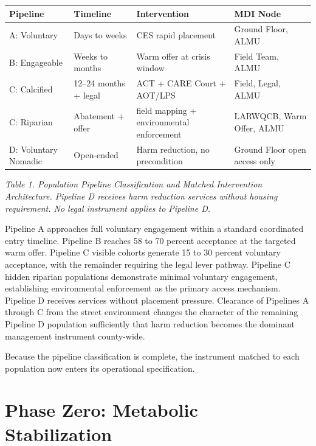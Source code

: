 \documentclass[12pt, letterpaper]{article}
\begin{document}
{\singlespacing
\begin{tabularx}{\textwidth}{@{}lXXX@{}}
\toprule
\rowcolor{rowgray}
Pipeline & Timeline & Intervention & MDI Node \\
\midrule
A: Voluntary & Days to weeks & CES rapid placement & Ground Floor, ALMU \\
\rowcolor{rowgray}
B: Engageable & Weeks to months & Warm offer at crisis window & Field Team, ALMU \\
C: Calcified & 12--24 months + legal & ACT + CARE Court + AOT/LPS & Field, Legal, ALMU \\
\rowcolor{rowgray}
C: Riparian & Abatement + offer & field mapping + environmental enforcement & LARWQCB, Warm Offer, ALMU \\
D: Voluntary Nomadic & Open-ended & Harm reduction, no precondition & Ground Floor open access only \\
\bottomrule
\end{tabularx}\par
\vspace{8pt}
\noindent\textit{Table 1. Population Pipeline Classification and Matched Intervention Architecture. Pipeline D receives harm reduction services without housing requirement. No legal instrument applies to Pipeline D.}
\par}
Pipeline A approaches full voluntary engagement within a standard coordinated entry timeline. Pipeline B reaches 58 to 70 percent acceptance at the targeted warm offer. Pipeline C visible cohorts generate 15 to 30 percent voluntary acceptance, with the remainder requiring the legal lever pathway. Pipeline C hidden riparian populations demonstrate minimal voluntary engagement, establishing environmental enforcement as the primary access mechanism. Pipeline D receives services without placement pressure. Clearance of Pipelines A through C from the street environment changes the character of the remaining Pipeline D population sufficiently that harm reduction becomes the dominant management instrument county-wide.

Because the pipeline classification is complete, the instrument matched to each population now enters its operational specification.

\clearpage
\section{Phase Zero: Metabolic Stabilization}
\end{document}
